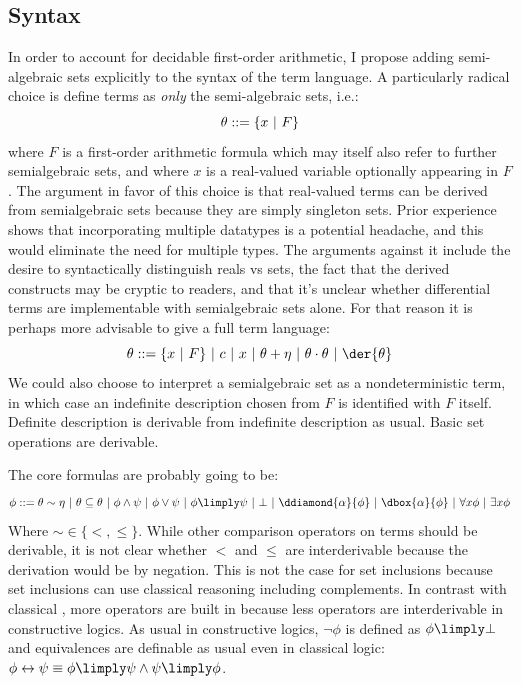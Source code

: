 \documentclass[12pt]{cmuthesis}
\theoremstyle{definition}
\theoremstyle{remark}
\newcommand{\bebecomes}{\mathrel{::=}}
\newcommand{\alternative}{~|~}
\newcommand{\lequiv}{\leftrightarrow}
\begin{document}
\subsection{Syntax}
In order to account for decidable first-order arithmetic, I propose adding semi-algebraic sets explicitly to the syntax of the term language.
A particularly radical choice is define terms as \emph{only} the semi-algebraic sets, i.e.:
\[\theta \bebecomes \semiset{x}{F}\]
where $F$ is a first-order arithmetic formula which may itself also refer to further semialgebraic sets, and where $x$ is a real-valued variable optionally appearing in $F$.
The argument in favor of this choice is that real-valued terms can be derived from semialgebraic sets because they are simply singleton sets.
Prior experience shows that incorporating multiple datatypes is a potential headache, and this would eliminate the need for multiple types.
The arguments against it include the desire to syntactically distinguish reals vs sets, the fact that the derived constructs may be cryptic to readers, and that it's unclear whether differential terms are implementable with semialgebraic sets alone.
For that reason it is perhaps more advisable to give a full term language:
\[\theta \bebecomes \semiset{x}{F} \alternative c \alternative x \alternative \theta + \eta \alternative \theta \cdot \theta \alternative \der{\theta}\]
We could also choose to interpret a semialgebraic set as a nondeterministic term, in which case an indefinite description chosen from $F$ is identified with $F$ itself.
Definite description is derivable from indefinite description as usual.
Basic set operations are derivable.

The core formulas are probably going to be:
\[\phi \bebecomes \theta \sim \eta \alternative \theta \subseteq \theta \alternative \phi \land \psi \alternative \phi \lor \psi \alternative \phi \limply \psi \alternative \bot \alternative \ddiamond{\alpha}{\phi} \alternative \dbox{\alpha}{\phi} \alternative \forall{x}{\phi} \alternative \exists{x}{\phi}\]
Where $\sim \in \{<, \leq\}$.
While other comparison operators on terms should be derivable, it is not clear whether $<$ and $\leq$ are interderivable because the derivation would be by negation.
This is not the case for set inclusions because set inclusions can use classical reasoning including complements.
In contrast with classical \dL, more operators are built in because less operators are interderivable in constructive logics.
As usual in constructive logics, $\neg \phi$ is defined as $\phi \limply \bot$ and equivalences are definable as usual even in classical logic: $\phi \lequiv \psi \equiv \phi \limply \psi \land \psi \limply \phi$.
\end{document}
